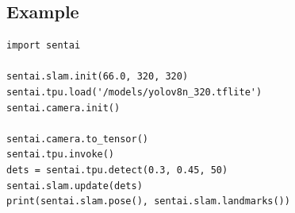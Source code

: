 \subsection{Example}\label{example-22}

\begin{verbatim}
import sentai

sentai.slam.init(66.0, 320, 320)
sentai.tpu.load('/models/yolov8n_320.tflite')
sentai.camera.init()

sentai.camera.to_tensor()
sentai.tpu.invoke()
dets = sentai.tpu.detect(0.3, 0.45, 50)
sentai.slam.update(dets)
print(sentai.slam.pose(), sentai.slam.landmarks())
\end{verbatim}
